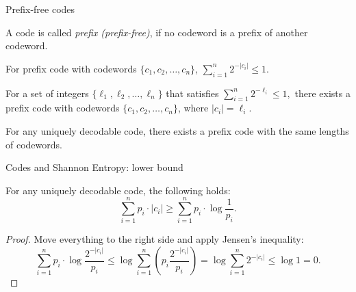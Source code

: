 \documentclass[handout,aspectratio=169]{beamer}
\newcommand{\seqn}[2]{{#1}_1,{#1}_2,\dotsc,{#1}_{#2}}
\begin{document}
    \begin{frame}{Prefix-free codes}
        \begin{definition}
            A code is called \emph{prefix (prefix-free)}, if no
            codeword is a prefix of another codeword.
        \end{definition}
        \pause
        \begin{theorem}\label{thm:mcmill}
            For prefix code with codewords
            \(\{\seqn{c}{n}\}\), $\sum_{i=1}^{n} 2^{-|c_i|} \le 1.$
        \end{theorem}
        \pause
        \begin{theorem}
            For a set of integers
            \(\{\seqn{\ell}{n}\}\)
            that satisfies
            $
            \sum_{i=1}^{n} 2^{-\ell_i} \le 1,
            $
            there exists a prefix code with codewords \(\{\seqn{c}{n}\}\), where \(|c_i| = \ell_i\).
        \end{theorem}
        \pause
        \begin{corollary}
            For any uniquely decodable code, there exists a prefix code with the same
            lengths of codewords.
        \end{corollary}
    \end{frame}

    \begin{frame}{Codes and Shannon Entropy: lower bound}
        \begin{theorem}[Shannon]
            For any uniquely decodable code, the following holds:
            \[
            \sum_{i=1}^n p_i \cdot |c_i| \ge \sum_{i=1}^n p_i \cdot \log \frac{1}{p_i}.
            \]
        \end{theorem}
        \begin{proof}
            Move everything to the right side and apply Jensen's inequality:
            \[
            \sum_{i=1}^n p_i \cdot \log \frac{2^{-|c_i|}}{p_i} \le
            \log \sum_{i=1}^n \left(p_i \frac{2^{-|c_i|}}{p_i}\right) =
            \log \sum_{i=1}^n 2^{-|c_i|} \le \log 1 = 0.
            \]
        \end{proof}
    \end{frame}
\end{document}
